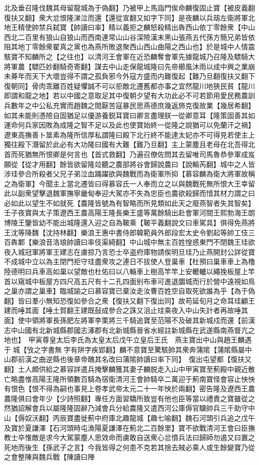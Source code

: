 北及垂召隆伐魏其母留龍城為于偽翻】乃被甲上馬詣門俟命麟復固止寶【被皮義翻復扶又翻】衆大忿恨隆涕泣而還【還從宣翻又如字下同】是夜麟以兵刼左衛將軍北地王精使帥禁兵弑寶【帥讀曰率】精以義拒之麟怒殺精出犇西山依丁零餘衆【中山西北二百里有狼山自狼山而西南連常山山谷深險漢末黑山張燕五代孫方簡兄弟皆依阻其地丁零餘衆翟真之黨也為燕所敗退聚西山西山曲陽之西山也】於是城中人情震駭寶不知麟所之【之往也】以清河王會軍在近恐麟奪會軍先據龍城乃召隆及驃騎大將軍農【驃匹妙翻騎奇寄翻】謀去中山走保龍城隆曰先帝櫛風沐雨以成中興之業崩未朞年而天下大壞豈得不謂之孤負邪今外寇方盛而内難復起【難乃旦翻復扶又翻下復朝同】骨肉乖離百姓疑懼誠不可以拒敵北遷舊都亦事之宜然龍川地狹民貧【龍川即謂和龍之地】若以中國之意取足其中復朝夕望有大功此必不可若節用愛民務農訓兵數年之中公私充實而趙魏之間厭苦寇暴民思燕德庶幾返斾克復故業【幾居希翻】如其未能則憑險自固猶足以優游養鋭耳寶曰卿言盡理朕一從卿意耳【隆策固善其如運命何兵家因敗為成隆之智不足以及此也使寶始終一從隆之說猶可以免蘭汗之禍】遼東高撫善卜筮素為隆所信厚私謂隆曰殿下北行終不能達太妃亦不可得見若使主上獨往殿下潛留於此必有大功隆曰國有大難【難乃旦翻】主上蒙塵且老母在北吾得北首而死猶無所恨卿是何言也【首式救翻】乃遍召僚佐問其去留唯司馬魯恭參軍成岌願從【從才用翻】餘皆欲留隆竝聽之農部將谷會歸說農曰【說輸芮翻】城中之人皆涉珪參合所殺者父兄子弟泣血踊躍欲與魏戰而為衛軍所抑【慕容麟為衛大將軍故稱之為衛軍】今聞主上當北遷皆曰得慕容氏一人奉而立之以與魏戰死無所恨大王幸留此以副衆望擊退魏軍撫寧畿甸奉迎大駕亦不失為忠臣也農欲殺歸而惜其材力謂之曰必如此以望生不如就死【農隆皆號為有智略而所見類如此天之廢燕智者失其智矣】壬子夜寶與太子策遼西王農高陽王隆長樂王盛等萬餘騎出赴會軍河間王熙勃海王朗博陵王鑒皆幼不能出城隆還入迎之自為鞁乘【鞁平義翻說文曰車駕具】俱得免燕將王沈等降魏【沈持林翻】樂浪王惠中書侍郎韓範員外郎段宏太史令劉起等帥工伎三百犇鄴【樂浪音洛琅帥讀曰率伎渠綺翻】中山城中無主百姓惶惑東門不閉魏王珪欲夜入城冠軍將軍王建志在虜掠乃言恐士卒盗府庫物請俟明旦珪乃止燕開封公詳從寶不成城中立以為主閉門拒守珪盡衆攻之連日不拔使人登巢車【杜預曰巢車車上為櫓陸德明曰兵車高如巢以望敵也杜佑曰以八輪車上樹高竿竿上安轆轤以繩挽板屋上竿首以窺城中板屋方四尺高五尺有十二孔四面别布車可進退圜城而行於營中遠視如鳥之巢亦謂之巢車】臨城諭之曰慕容寶已棄汝走汝曹百姓空自取死欲誰為乎【為于偽翻】皆曰羣小無知恐復如參合之衆【復扶又翻下復出同】故苟延旬月之命耳珪顧王建而唾其面【唾土賀翻王建既鼔成參合之誅又沮止珪乘夜入中山失計者再故唾其面】使中領將軍長孫肥左將軍李栗將三千騎追寶至范陽不及破其新城戍而還【前漢志中山國有北新城縣郡國志涿郡有北新城縣晉省水經註新城縣在武遂縣南燕督亢之地也】　甲寅尊皇太后李氏為太皇太后戊午立皇后王氏　燕主寶出中山與趙王麟遇于城【攷之字書無字有阱字疾郢翻】麟不意寶至驚駭帥其衆奔蒲隂【蒲隂縣屬中山郡前漢之曲逆縣也後章帝醜其名改曰蒲隂帥讀曰率下同】　復出屯望都【復扶又翻】土人頗供給之慕容詳遣兵掩擊麟獲其妻子麟脱走入山中甲寅寶至薊殿中親近散亡略盡惟高陽王隆所領數百騎為宿衛清河王會帥騎卒二萬迎于薊南寶怪會容止怏怏有恨色【恨不得為嗣也事見上卷孝武帝太元二十一年怏於兩翻】密告隆及遼西王農農隆俱曰會年少【少詩照翻】專任方面習驕所致豈有他也臣等當以禮責之寶雖從之然猶詔解會兵以屬隆隆固辭乃減會兵分給農隆又遣西河公庫傉官驥帥兵三千助守中山【傉奴沃翻】丙辰寶盡徙薊中府庫北趣龍城【趣七喻翻】魏石河頭引兵追之戊午及寶於夏謙澤【石河頭時屯漁陽夏謙澤在薊北二百餘里】寶不欲戰清河王會曰臣撫教士卒惟敵是求今大駕蒙塵人思效命而虜敢自送衆心忿憤兵法曰歸師勿遏又曰置之死地而後生【孫武子之言】今我皆得之何患不克若其捨去賊必乘人或生餘變寶乃從之會整陳與魏兵戰【陳讀曰陣